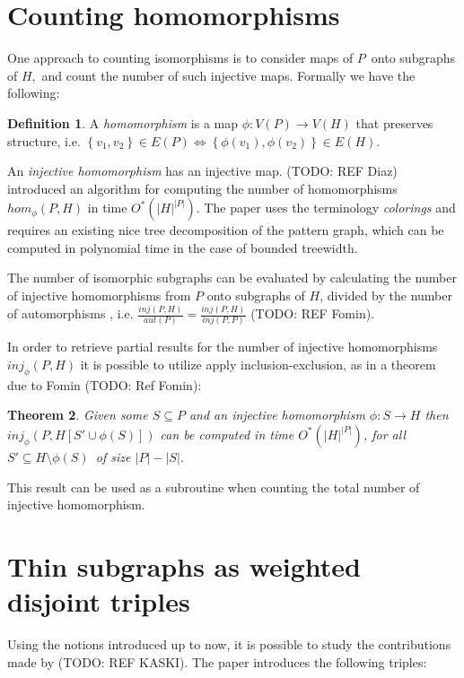 \documentclass[a4paper,11pt]{report}
\theoremstyle{plain}
\newtheorem{thm}{Theorem}[chapter] %
\theoremstyle{definition}
\newtheorem{defn}[thm]{Definition} %
\begin{document}
\begin{figure}[here]
\end{figure}

\section{Counting homomorphisms}
One approach to counting isomorphisms is to consider maps of $P$ onto subgraphs of $H$, and count the number of such injective maps.
Formally we have the following:

\begin{defn}
A \emph{homomorphism} is a map $\phi : V(P) \rightarrow V(H)$ that preserves structure,
i.e. $\left\{v_1, v_2\right\} \in E(P) \Leftrightarrow \left\{\phi(v_1), \phi(v_2)\right\} \in E(H)$.
\end{defn}


An \emph{injective homomorphism} has an injective map.
(TODO: REF Diaz) introduced an algorithm for computing the number of homomorphisms $hom_{\phi}(P, H)$ in time $O^*(|H|^{|P|})$.
The paper uses the terminology \emph{colorings} and requires an existing nice tree decomposition of the pattern graph, which can be computed in polynomial time in the case of bounded treewidth.

The number of isomorphic subgraphs can be evaluated by calculating the number of injective homomorphisms from $P$ onto subgraphs of $H$, divided by the number of automorphisms
, i.e. $\frac{inj(P, H)}{aut(P)} = \frac{inj(P, H)}{inj(P, P)}$ (TODO: REF Fomin).

In order to retrieve partial results for the number of injective homomorphisms $inj_{\phi}(P, H)$ it is possible to utilize apply inclusion-exclusion, as in a theorem due to Fomin (TODO: Ref Fomin):

\begin{thm}
\label{thm:fomin}
Given some $S \subseteq P$ and an injective homomorphism $\phi : S \rightarrow H$ then $inj_{\phi}(P, H[S' \cup \phi(S)])$ can be computed in time $O^*(|H|^{|P|})$, for all $S' \subseteq H \setminus \phi(S)$ of size $|P| - |S|$.
\end{thm}


This result can be used as a subroutine when counting the total number of injective homomorphism.

\section{Thin subgraphs as weighted disjoint triples}
Using the notions introduced up to now, it is possible to study the contributions made by (TODO: REF KASKI).
The paper introduces the following triples:
\end{document}

